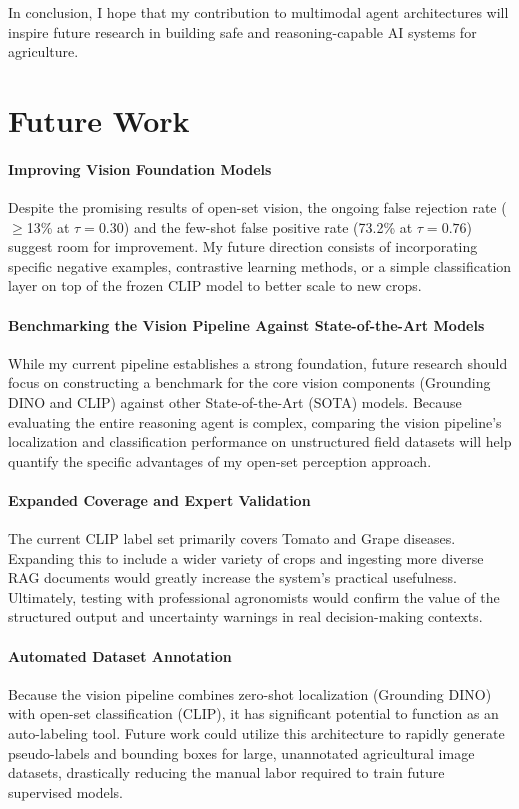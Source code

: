In conclusion, I hope that my contribution to multimodal agent architectures will inspire future research in building safe and reasoning-capable AI systems for agriculture.

\section{Future Work}

\paragraph{Improving Vision Foundation Models}
Despite the promising results of open-set vision, the ongoing false rejection rate ($\geq$13\% at $\tau=0.30$) and the few-shot false positive rate (73.2\% at $\tau=0.76$) suggest room for improvement. My future direction consists of incorporating specific negative examples, contrastive learning methods, or a simple classification layer on top of the frozen CLIP model to better scale to new crops. 

\paragraph{Benchmarking the Vision Pipeline Against State-of-the-Art Models}
While my current pipeline establishes a strong foundation, future research should focus on constructing a benchmark for the core vision components (Grounding DINO and CLIP) against other State-of-the-Art (SOTA) models. Because evaluating the entire reasoning agent is complex, comparing the vision pipeline's localization and classification performance on unstructured field datasets will help quantify the specific advantages of my open-set perception approach.

\paragraph{Expanded Coverage and Expert Validation}
The current CLIP label set primarily covers Tomato and Grape diseases. Expanding this to include a wider variety of crops and ingesting more diverse RAG documents would greatly increase the system's practical usefulness. Ultimately, testing with professional agronomists would confirm the value of the structured output and uncertainty warnings in real decision-making contexts.

\paragraph{Automated Dataset Annotation}
Because the vision pipeline combines zero-shot localization (Grounding DINO) with open-set classification (CLIP), it has significant potential to function as an auto-labeling tool. Future work could utilize this architecture to rapidly generate pseudo-labels and bounding boxes for large, unannotated agricultural image datasets, drastically reducing the manual labor required to train future supervised models.

